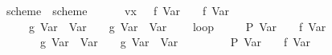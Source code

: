 \begin{isabellebody}
\ scheme{}\ \ {}scheme{}\ {}\isanewline
\ \ {}\ {}\ {}{}\ vx{}\ {}\ {}{}\ f\ {}Var\ {}{}{}\ {}\ {}{}\ f\ {}Var\ {}{}\isanewline
\ \ {}\ {}\ {}{}\ g\ {}Var\ {}{}\ {}Var\ {}{}{}\ {}\ {}{}\ g\ {}Var\ {}{}\ {}Var\ {}{}\isanewline
\ \ {}\ loop\isanewline
\ \ \ \ {}\ {}{}P\ {}Var\ {}{}{}{}\ {}\ {}{}\ f\ {}Var\ {}{}\isanewline
\ \ \ \ {}\ {}\ {}{}\ g\ {}Var\ {}{}\ {}Var\ {}{}{}\ {}\ {}{}\ g\ {}Var\ {}{}\ {}Var\ {}{}\isanewline
\ \ \ \ {}\isanewline
\ \ {}\ P\ {}Var\ {}{}{}\ {}\ {}{}\ f\ {}Var\ {}{}\isanewline

\end{isabellebody}
